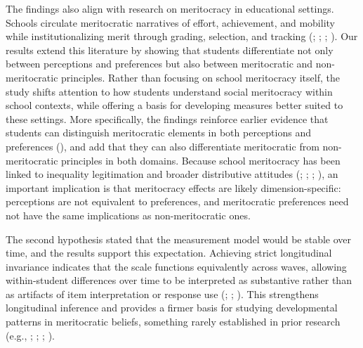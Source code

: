\documentclass[
  13pt,
]{article}
\begin{document}
The findings also align with research on meritocracy in educational
settings. Schools circulate meritocratic narratives of effort,
achievement, and mobility while institutionalizing merit through
grading, selection, and tracking
(;
;
;
). Our results
extend this literature by showing that students differentiate not only
between perceptions and preferences but also between meritocratic and
non-meritocratic principles. Rather than focusing on school meritocracy
itself, the study shifts attention to how students understand social
meritocracy within school contexts, while offering a basis for
developing measures better suited to these settings. More specifically,
the findings reinforce earlier evidence that students can distinguish
meritocratic elements in both perceptions and preferences
(), and
add that they can also differentiate meritocratic from non-meritocratic
principles in both domains. Because school meritocracy has been linked
to inequality legitimation and broader distributive attitudes
(;
;
;
), an
important implication is that meritocracy effects are likely
dimension-specific: perceptions are not equivalent to preferences, and
meritocratic preferences need not have the same implications as
non-meritocratic ones.

The second hypothesis stated that the measurement model would be stable
over time, and the results support this expectation. Achieving strict
longitudinal invariance indicates that the scale functions equivalently
across waves, allowing within-student differences over time to be
interpreted as substantive rather than as artifacts of item
interpretation or response use (; ; ). This strengthens longitudinal inference and
provides a firmer basis for studying developmental patterns in
meritocratic beliefs, something rarely established in prior research
(e.g., ;
;
;
).
\end{document}
